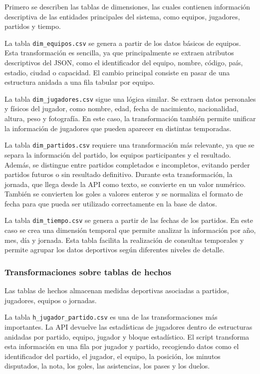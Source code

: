 Primero se describen las tablas de dimensiones, las cuales contienen información descriptiva de las entidades principales del sistema, como equipos, jugadores, partidos y tiempo.

La tabla \texttt{dim\_equipos.csv} se genera a partir de los datos básicos de equipos. Esta transformación es sencilla, ya que principalmente se extraen atributos descriptivos del JSON, como el identificador del equipo, nombre, código, país, estadio, ciudad o capacidad. El cambio principal consiste en pasar de una estructura anidada a una fila tabular por equipo.

La tabla \texttt{dim\_jugadores.csv} sigue una lógica similar. Se extraen datos personales y físicos del jugador, como nombre, edad, fecha de nacimiento, nacionalidad, altura, peso y fotografía. En este caso, la transformación también permite unificar la información de jugadores que pueden aparecer en distintas temporadas.

La tabla \texttt{dim\_partidos.csv} requiere una transformación más relevante, ya que se separa la información del partido, los equipos participantes y el resultado. Además, se distingue entre partidos completados e incompletos, evitando perder partidos futuros o sin resultado definitivo. Durante esta transformación, la jornada, que llega desde la API como texto, se convierte en un valor numérico. También se convierten los goles a valores enteros y se normaliza el formato de fecha para que pueda ser utilizado correctamente en la base de datos.

La tabla \texttt{dim\_tiempo.csv} se genera a partir de las fechas de los partidos. En este caso se crea una dimensión temporal que permite analizar la información por año, mes, día y jornada. Esta tabla facilita la realización de consultas temporales y permite agrupar los datos deportivos según diferentes niveles de detalle.

\subsubsection{Transformaciones sobre tablas de hechos}

Las tablas de hechos almacenan medidas deportivas asociadas a partidos, jugadores, equipos o jornadas.

La tabla \texttt{h\_jugador\_partido.csv} es una de las transformaciones más importantes. La API devuelve las estadísticas de jugadores dentro de estructuras anidadas por partido, equipo, jugador y bloque estadístico. El script transforma esta información en una fila por jugador y partido, recogiendo datos como el identificador del partido, el jugador, el equipo, la posición, los minutos disputados, la nota, los goles, las asistencias, los pases y los duelos.

